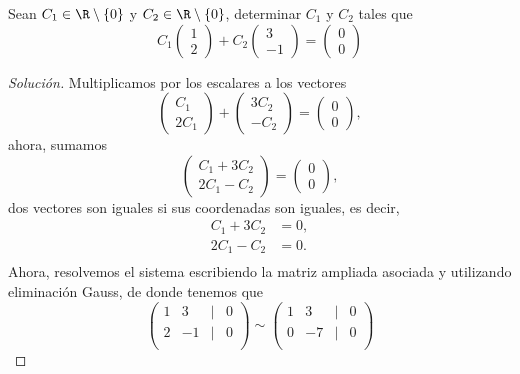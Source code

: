 \documentclass[a4,11pt]{aleph-notas}
\begin{document}
\begin{ejer}
    Sean $C_1 \in \R \setminus \{ 0 \}$ y $C_2 \in \R \setminus \{ 0 \}$, determinar $C_1$ y $C_2$ tales que
    \[
    C_1 \begin{pmatrix} 1 \\ 2 \end{pmatrix} + C_2 \begin{pmatrix} 3 \\ -1 \end{pmatrix} = \begin{pmatrix} 0 \\ 0 \end{pmatrix}
    \]
\end{ejer}

\begin{proof}[Solución]\hspace{0pt}
    Multiplicamos por los escalares a los vectores
    \[
    \begin{pmatrix} C_1 \\ 2C_1 \end{pmatrix} + \begin{pmatrix} 3C_2 \\ -C_2 \end{pmatrix} = \begin{pmatrix} 0 \\ 0 \end{pmatrix},
    \]
    ahora, sumamos
    \[
    \begin{pmatrix} C_1 + 3C_2 \\ 2C_1 - C_2 \end{pmatrix}  = \begin{pmatrix} 0 \\ 0 \end{pmatrix},
    \]
    dos vectores son iguales si sus coordenadas son iguales, es decir,
    \begin{align*}
        C_1+3C_2&=0,\\
        2C_1- C_2&=0.\\
    \end{align*}
    Ahora, resolvemos el sistema escribiendo la matriz ampliada asociada y utilizando eliminación Gauss, de donde tenemos que
    \[
    \begin{pmatrix}
    1 & 3 & | & 0 \\ 2 & -1 & | & 0 \\
    \end{pmatrix}
    \sim
    \begin{pmatrix}
    1 & 3 & | & 0 \\ 0 & -7 & | & 0 \\

\end{pmatrix}\]
\end{proof}
\end{document}
